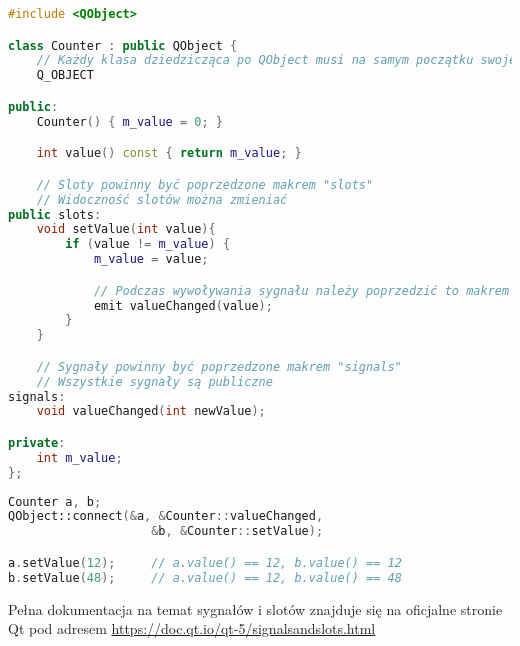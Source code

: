 
\begin{lstlisting}[language=C++]
#include <QObject>

class Counter : public QObject {
    // Każdy klasa dziedzicząca po QObject musi na samym początku swojej definicji mieć makro "Q_OBJECT"
    Q_OBJECT

public:
    Counter() { m_value = 0; }

    int value() const { return m_value; }

    // Sloty powinny być poprzedzone makrem "slots"
    // Widoczność slotów można zmieniać 
public slots:
    void setValue(int value){
        if (value != m_value) {
            m_value = value;

            // Podczas wywoływania sygnału należy poprzedzić to makrem "emit"
            emit valueChanged(value);
        }
    }

    // Sygnały powinny być poprzedzone makrem "signals"
    // Wszystkie sygnały są publiczne
signals:
    void valueChanged(int newValue);

private:
    int m_value;
};

\end{lstlisting}

\begin{lstlisting}[language=C++]
Counter a, b;
QObject::connect(&a, &Counter::valueChanged,
                    &b, &Counter::setValue);

a.setValue(12);     // a.value() == 12, b.value() == 12
b.setValue(48);     // a.value() == 12, b.value() == 48

\end{lstlisting}

\par
Pełna dokumentacja na temat sygnałów i slotów znajduje się na oficjalne stronie Qt pod adresem \url{https://doc.qt.io/qt-5/signalsandslots.html}